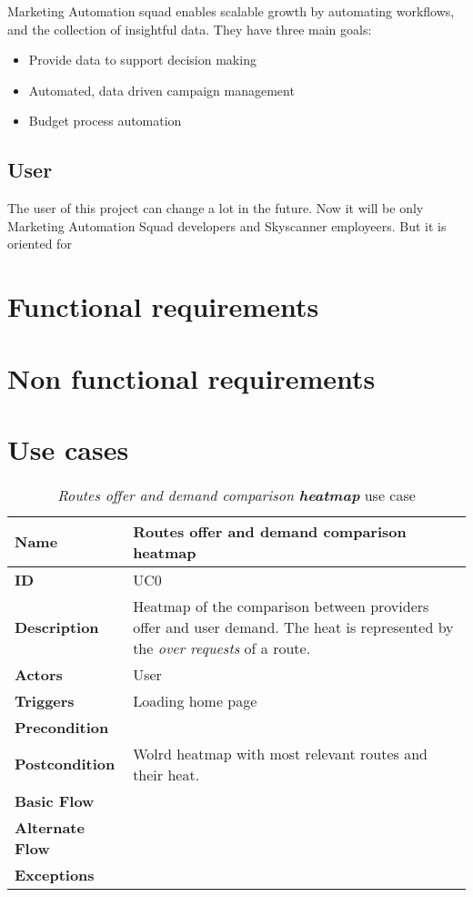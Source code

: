 Marketing Automation squad enables scalable growth by automating workflows, and the collection of insightful data. They have three main goals:

\begin{itemize}
  \item Provide data to support decision making
  \item Automated, data driven campaign management
  \item Budget process automation
\end{itemize}



\subsection{User}

The user of this project can change a lot in the future. Now it will be only Marketing Automation Squad developers and Skyscanner employeers. But it is oriented for 

\section{Functional requirements}

\section{Non functional requirements}

\section{Use cases}

\begin{table}
\begin{tabular}{|>{\raggedright\arraybackslash}p{3.2cm}|>{\raggedright\arraybackslash}p{10cm}|}
\hline
\textbf{Name}                   & Routes offer and demand comparison \textbf{heatmap} \\
\hline
\textbf{ID}                     & UC0 \\
\hline
\textbf{Description}            & Heatmap of the comparison between providers offer and user demand. The heat is represented by the \textit{over requests} of a route. \\
\hline
\textbf{Actors}                 & User \\
\hline
\textbf{Triggers}               & Loading home page \\
\hline
\textbf{Precondition}           & \\
\hline
\textbf{Postcondition}          & Wolrd heatmap with most relevant routes and their heat. \\
\hline
\textbf{Basic Flow}             & \\
\hline
\textbf{Alternate Flow}         & \\
\hline
\textbf{Exceptions}             & \\
\hline
\end{tabular}
\caption{\textit{Routes offer and demand comparison \textbf{heatmap}} use case}
\label{UC0}
\end{table}

